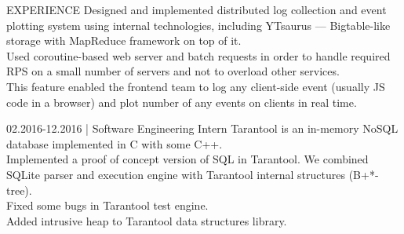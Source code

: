 \documentclass[12pt]{cutecv}
\begin{document}
\begin{paracol}{2}
\begin{rightcolumn}
\begin{cvsection}{EXPERIENCE}
  {Designed and implemented distributed log collection and event
   plotting system using internal technologies, including YTsaurus — Bigtable-like
   storage with MapReduce framework on top of it. \\
   Used coroutine-based web server and batch requests in order
   to handle required RPS on a small number of servers and not to overload
   other services. \\
   This feature enabled the frontend team to log any client-side
   event (usually JS code in a browser) and plot number of any events on
   clients in real time.}

  {02.2016-12.2016 | Software Engineering Intern}
  {Tarantool is an in-memory NoSQL database implemented in C with some C++.\\
   Implemented a proof of concept version of SQL in Tarantool.
   We combined SQLite parser and execution engine with Tarantool internal structures (B+*-tree).\\
   Fixed some bugs in Tarantool test engine.\\
   Added intrusive heap to Tarantool data structures library.}
\end{cvsection}

\end{rightcolumn}
\end{paracol}
\end{document}
